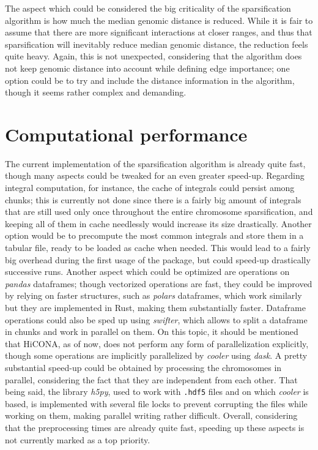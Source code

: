 The aspect which could be considered the big criticality of the sparsification algorithm is how much the median genomic distance is reduced. While it is fair to assume that there are more significant interactions at closer ranges, and thus that sparsification will inevitably reduce median genomic distance, the reduction feels quite heavy. Again, this is not unexpected, considering that the algorithm does not keep genomic distance into account while defining edge importance; one option could be to try and include the distance information in the algorithm, though it seems rather complex and demanding.


\section{Computational performance}

The current implementation of the sparsification algorithm is already quite fast, though many aspects could be tweaked for an even greater speed-up. Regarding integral computation, for instance, the cache of integrals could persist among chunks; this is currently not done since there is a fairly big amount of integrals that are still used only once throughout the entire chromosome sparsification, and keeping all of them in cache needlessly would increase its size drastically. Another option would be to precompute the most common integrals and store them in a tabular file, ready to be loaded as cache when needed. This would lead to a fairly big overhead during the first usage of the package, but could speed-up drastically successive runs. Another aspect which could be optimized are operations on \textit{pandas} dataframes; though vectorized operations are fast, they could be improved by relying on faster structures, such as \textit{polars}\cite{polars2023} dataframes, which work similarly but they are implemented in Rust, making them substantially faster. Dataframe operations could also be sped up using \textit{swifter}\cite{swifter2023}, which allows to split a dataframe in chunks and work in parallel on them. On this topic, it should be mentioned that HiCONA, as of now, does not perform any form of parallelization explicitly, though some operations are implicitly parallelized by \textit{cooler} using \textit{dask}\cite{dask2023}. A pretty substantial speed-up could be obtained by processing the chromosomes in parallel, considering the fact that they are independent from each other. That being said, the library \textit{h5py}\cite{h5py2023}, used to work with \texttt{.hdf5} files and on which \textit{cooler} is based, is implemented with several file locks to prevent corrupting the files while working on them, making parallel writing rather difficult. Overall, considering that the preprocessing times are already quite fast, speeding up these aspects is not currently marked as a top priority.

